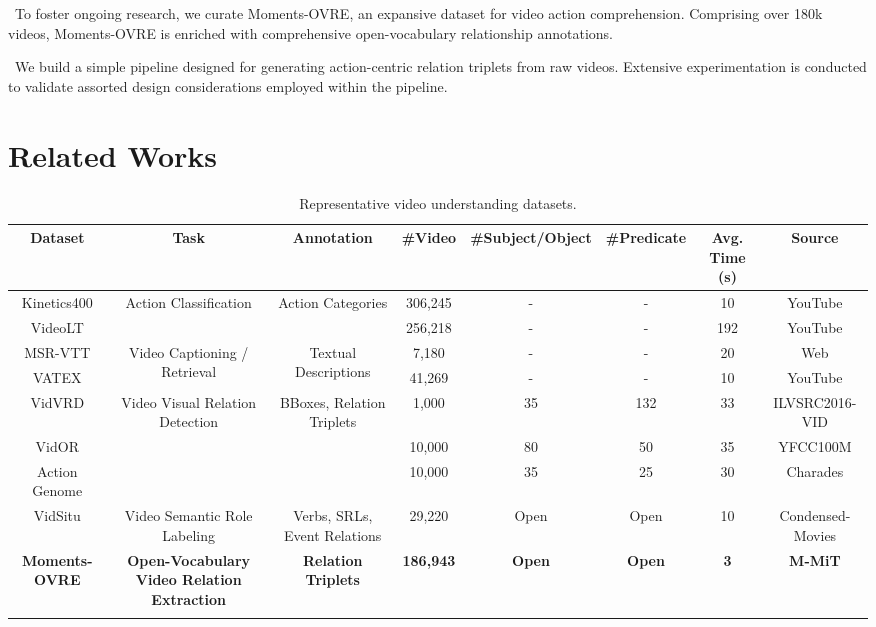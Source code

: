 \documentclass[letterpaper]{article}
\begin{document}
\textbullet \ To foster ongoing research, we curate Moments-OVRE, an expansive dataset for video action comprehension. Comprising over 180k videos, Moments-OVRE is enriched with comprehensive open-vocabulary relationship annotations.

\textbullet \ We build a simple pipeline designed for generating action-centric relation triplets from raw videos. Extensive experimentation is conducted to validate assorted design considerations employed within the pipeline.


\section{Related Works}













\begin{table}[t]
    \centering
    \caption{Representative video understanding datasets.}
    \begin{adjustbox}{width=\textwidth}
    \begin{tabular}{cccccccc}
        \toprule
        Dataset & Task & Annotation & \#Video & \#Subject/Object & \#Predicate & Avg. Time (s) & Source \\
        \midrule
        Kinetics400 & \multirow{2}{*}{Action Classification} & \multirow{2}{*}{Action Categories} & 306,245 & - & - & 10 & YouTube\\
        VideoLT &  &  & 256,218 & - & - & 192 & YouTube\\
        \midrule
         MSR-VTT & \multirow{2}{*}{Video Captioning / Retrieval} & \multirow{2}{*}{Textual Descriptions} & 7,180 & - & - & 20 & Web\\
         VATEX & & & 41,269 & - & - & 10 & YouTube\\
        \midrule
        VidVRD & \multirow{3}{*}{Video Visual Relation Detection} & \multirow{3}{*}{BBoxes, Relation Triplets} & 1,000 & 35 & 132 & 33 & ILVSRC2016-VID\\
        VidOR & & & 10,000 & 80 & 50 & 35 & YFCC100M\\
        Action Genome & & & 10,000 & 35 & 25 & 30 & Charades\\
        \midrule
        VidSitu & Video Semantic Role Labeling & Verbs, SRLs, Event Relations & 29,220 & Open & Open & 10 & Condensed-Movies\\
        \midrule
        \textbf{Moments-OVRE} & \textbf{Open-Vocabulary Video Relation Extraction} & \textbf{Relation Triplets} & \textbf{186,943} & \textbf{Open} & \textbf{Open} & \textbf{3} & \textbf{M-MiT}\\

        \bottomrule
        \\
    \end{tabular}
    \end{adjustbox}
    \label{tab:dataset_comp}
\end{table}
\end{document}
